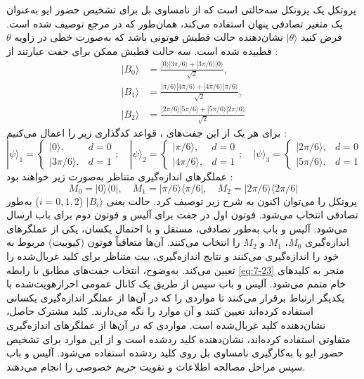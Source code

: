 پروتکل  یک پروتکل سه‌حالتی است که از نامساوی بل برای تشخیص حضور ایو به‌عنوان یک متغیر تصادفی پنهان استفاده می‌کند، همان‌طور که در مرجع \cite{7-38} توصیف شده است. فرض کنید $|\theta\rangle$ نشان‌دهنده حالت قطبش فوتونی باشد که به‌صورت خطی در زاویه $\theta$ قطبیده شده است. سه حالت قطبش ممکن برای جفت  عبارتند از \cite{7-38}:
\begin{equation}
	\begin{aligned}
		|B_0\rangle &= \frac{|0\rangle|3\pi/6\rangle + |3\pi/6\rangle|0\rangle}{\sqrt{2}}, \\
		|B_1\rangle &= \frac{|\pi/6\rangle|4\pi/6\rangle + |4\pi/6\rangle|\pi/6\rangle}{\sqrt{2}}, \\
		|B_2\rangle &= \frac{|2\pi/6\rangle|5\pi/6\rangle + |5\pi/6\rangle|2\pi/6\rangle}{\sqrt{2}}
	\end{aligned}
	\label{eq:7-23}
\end{equation}
برای هر یک از این جفت‌های ، قواعد کدگذاری زیر را اعمال می‌کنیم \cite{7-38}:
\begin{equation}
	|\psi\rangle_1 = \begin{cases} |0\rangle, & d=0 \\ |3\pi/6\rangle, & d=1 \end{cases}; \quad 
	|\psi\rangle_2 = \begin{cases} |\pi/6\rangle, & d=0 \\ |4\pi/6\rangle, & d=1 \end{cases}; \quad 
	|\psi\rangle_3 = \begin{cases} |2\pi/6\rangle, & d=0 \\ |5\pi/6\rangle, & d=1 \end{cases}
	\label{eq:7-24}
\end{equation}
عملگرهای اندازه‌گیری متناظر به‌صورت زیر خواهند بود \cite{7-38}:
\begin{equation}
	M_0 = |0\rangle\langle 0|, \quad M_1 = |\pi/6\rangle\langle \pi/6|, \quad M_2 = |2\pi/6\rangle\langle 2\pi/6|
	\label{eq:7-25}
\end{equation}
پروتکل  را می‌توان اکنون به شرح زیر توصیف کرد. حالت  یعنی $|B_i\rangle$ ($i=0,1,2$) به‌طور تصادفی انتخاب می‌شود. فوتون اول در جفت  برای آلیس و فوتون دوم برای باب ارسال می‌شود. آلیس و باب به‌طور تصادفی، مستقل و با احتمال یکسان، یکی از عملگرهای اندازه‌گیری $M_0$، $M_1$ و $M_2$ را انتخاب می‌کنند. آن‌ها متعاقباً فوتون (کیوبیت) مربوط به خود را اندازه‌گیری می‌کنند و نتایج اندازه‌گیری، بیت متناظر برای کلید غربال‌شده را تعیین می‌کند. به‌وضوح، انتخاب جفت‌های  مطابق با رابطه \eqref{eq:7-23} منجر به کلیدهای خام متمم می‌شود. آلیس و باب سپس از طریق یک کانال عمومی احرازهویت‌شده با یکدیگر ارتباط برقرار می‌کنند تا مواردی را که در آن‌ها از عملگر اندازه‌گیری یکسانی استفاده کرده‌اند تعیین کنند و آن موارد را نگه می‌دارند. کلید مشترک حاصل، نشان‌دهنده کلید غربال‌شده است. مواردی که در آن‌ها از عملگرهای اندازه‌گیری متفاوتی استفاده کرده‌اند، نشان‌دهنده کلید ردشده است و از این موارد برای تشخیص حضور ایو با به‌کارگیری نامساوی بل روی کلید ردشده استفاده می‌شود. آلیس و باب سپس مراحل مصالحه اطلاعات و تقویت حریم خصوصی را انجام می‌دهند.

